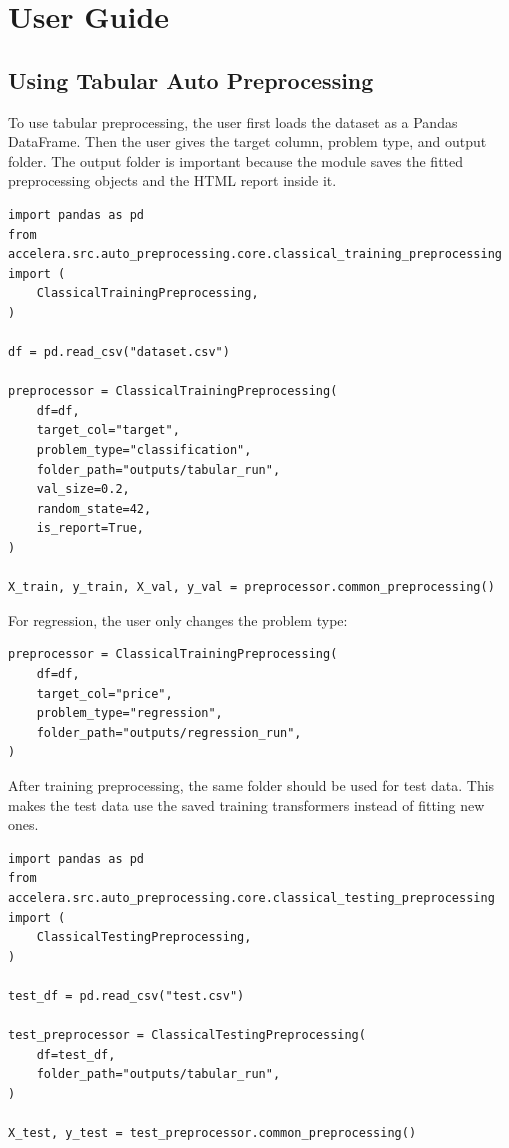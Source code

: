 \documentclass[12pt,a4paper]{report}
\renewcommand{\lstlistingname}{Algorithm}
\begin{document}
\renewcommand{\lstlistingname}{Code Example}
\chapter{User Guide}
\section{Using Tabular Auto Preprocessing}
To use tabular preprocessing, the user first loads the dataset as a Pandas
DataFrame. Then the user gives the target column, problem type, and output
folder. The output folder is important because the module saves the fitted
preprocessing objects and the HTML report inside it.

\begin{lstlisting}[style=code,caption={Calling tabular training preprocessing}]
import pandas as pd
from accelera.src.auto_preprocessing.core.classical_training_preprocessing import (
    ClassicalTrainingPreprocessing,
)

df = pd.read_csv("dataset.csv")

preprocessor = ClassicalTrainingPreprocessing(
    df=df,
    target_col="target",
    problem_type="classification",
    folder_path="outputs/tabular_run",
    val_size=0.2,
    random_state=42,
    is_report=True,
)

X_train, y_train, X_val, y_val = preprocessor.common_preprocessing()
\end{lstlisting}

For regression, the user only changes the problem type:

\begin{lstlisting}[style=code,caption={Changing tabular preprocessing to regression}]
preprocessor = ClassicalTrainingPreprocessing(
    df=df,
    target_col="price",
    problem_type="regression",
    folder_path="outputs/regression_run",
)
\end{lstlisting}

After training preprocessing, the same folder should be used for test data.
This makes the test data use the saved training transformers instead of fitting
new ones.

\begin{lstlisting}[style=code,caption={Calling tabular testing preprocessing}]
import pandas as pd
from accelera.src.auto_preprocessing.core.classical_testing_preprocessing import (
    ClassicalTestingPreprocessing,
)

test_df = pd.read_csv("test.csv")

test_preprocessor = ClassicalTestingPreprocessing(
    df=test_df,
    folder_path="outputs/tabular_run",
)

X_test, y_test = test_preprocessor.common_preprocessing()
\end{lstlisting}
\end{document}
